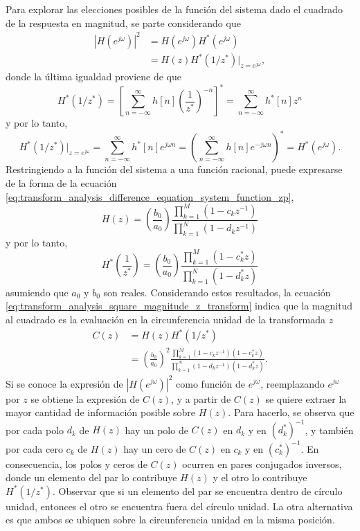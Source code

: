 \documentclass[a4paper]{report}
\begin{document}
Para explorar las elecciones posibles de la función del sistema dado el cuadrado de la respuesta en magnitud, se parte considerando que 
\begin{align}
 |H(e^{j\omega})|^2&=H(e^{j\omega})H^*(e^{j\omega})\nonumber\\
  &=H(z)H^*(1/z^*)\big|_{z=e^{j\omega}}\label{eq:transform_analysis_square_magnitude_z_transform},
\end{align}
donde la última igualdad proviene de que 
\[
 H^*(1/z^*)=\left[\sum_{n=-\infty}^{\infty}h[n]\left(\frac{1}{z^*}\right)^{-n}\right]^*
   =\sum_{n=-\infty}^{\infty}h^*[n]z^n
\]
y por lo tanto,
\[
 H^*(1/z^*)\big|_{z=e^{j\omega}}=\sum_{n=-\infty}^{\infty}h^*[n]e^{j\omega n}=\left(\sum_{n=-\infty}^{\infty}h[n]e^{-j\omega n}\right)^*=H^*(e^{j\omega}).
\]
Restringiendo a la función del sistema a una función racional, puede expresarse de la forma de la ecuación \ref{eq:transform_analysis_difference_equation_system_function_zp},
\[
 H(z)=\left(\frac{b_0}{a_0}\right)\frac{\prod\limits_{k=1}^M(1-c_kz^{-1})}{\prod\limits_{k=1}^N(1-d_kz^{-1})}
\]
y por lo tanto,
\[
 H^*\left(\frac{1}{z^*}\right)=\left(\frac{b_0}{a_0}\right)\frac{\prod\limits_{k=1}^M(1-c^*_kz)}{\prod\limits_{k=1}^N(1-d^*_kz)}
\]
asumiendo que \(a_0\) y \(b_0\) son reales. Considerando estos resultados, la ecuación \ref{eq:transform_analysis_square_magnitude_z_transform} indica que la magnitud al cuadrado es la evaluación en la circunferencia unidad de la transformada \(z\)
\begin{align}
 C(z)&=H(z)H^*(1/z^*)\nonumber\\
  &=\left(\frac{b_0}{a_0}\right)^2\frac{\prod\limits_{k=1}^M(1-c_kz^{-1})(1-c^*_kz)}{\prod\limits_{k=1}^N(1-d_kz^{-1})(1-d^*_kz)}.\label{eq:transform_analysis_square_magnitude_z_transform_cz}
\end{align}
Si se conoce la expresión de \(|H(e^{j\omega})|^2\) como función de \(e^{j\omega}\), reemplazando \(e^{j\omega}\) por \(z\) se obtiene la expresión de \(C(z)\), y a partir de \(C(z)\) se quiere extraer la mayor cantidad de información posible sobre \(H(z)\). Para hacerlo, se observa que por cada polo \(d_k\) de \(H(z)\) hay un polo de \(C(z)\) en \(d_k\) y en \((d_k^*)^{-1}\), y también por cada cero \(c_k\) de \(H(z)\) hay un cero de \(C(z)\) en \(c_k\) y en \((c_k^*)^{-1}\). En consecuencia, los polos y ceros de \(C(z)\) ocurren en pares conjugados inversos, donde un elemento del par lo contribuye \(H(z)\) y el otro lo contribuye \(H^*(1/z^*)\). Observar que si un elemento del par se encuentra dentro de círculo unidad, entonces el otro se encuentra fuera del círculo unidad. La otra alternativa es que ambos se ubiquen sobre la circunferencia unidad en la misma posición.
\end{document}
